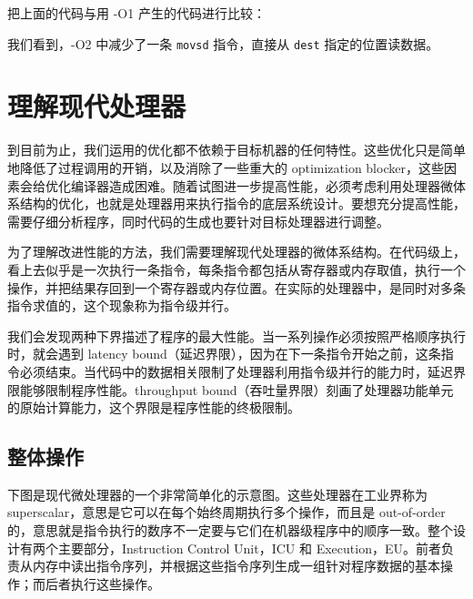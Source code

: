 把上面的代码与用 -O1 产生的代码进行比较：


我们看到，-O2 中减少了一条 \verb|movsd| 指令，直接从 \verb|dest| 指定的位置读数据。

\section{理解现代处理器}

到目前为止，我们运用的优化都不依赖于目标机器的任何特性。这些优化只是简单地降低了过程调用的开销，以及消除了一些重大的 optimization blocker，这些因素会给优化编译器造成困难。随着试图进一步提高性能，必须考虑利用处理器微体系结构的优化，也就是处理器用来执行指令的底层系统设计。要想充分提高性能，需要仔细分析程序，同时代码的生成也要针对目标处理器进行调整。

为了理解改进性能的方法，我们需要理解现代处理器的微体系结构。在代码级上，看上去似乎是一次执行一条指令，每条指令都包括从寄存器或内存取值，执行一个操作，并把结果存回到一个寄存器或内存位置。在实际的处理器中，是同时对多条指令求值的，这个现象称为指令级并行。

我们会发现两种下界描述了程序的最大性能。当一系列操作必须按照严格顺序执行时，就会遇到 latency bound（延迟界限），因为在下一条指令开始之前，这条指令必须结束。当代码中的数据相关限制了处理器利用指令级并行的能力时，延迟界限能够限制程序性能。throughput bound（吞吐量界限）刻画了处理器功能单元的原始计算能力，这个界限是程序性能的终极限制。

\subsection{整体操作}

下图是现代微处理器的一个非常简单化的示意图。这些处理器在工业界称为 superscalar，意思是它可以在每个始终周期执行多个操作，而且是 out-of-order 的，意思就是指令执行的数序不一定要与它们在机器级程序中的顺序一致。整个设计有两个主要部分，Instruction Control Unit，ICU 和 Execution，EU。前者负责从内存中读出指令序列，并根据这些指令序列生成一组针对程序数据的基本操作；而后者执行这些操作。

